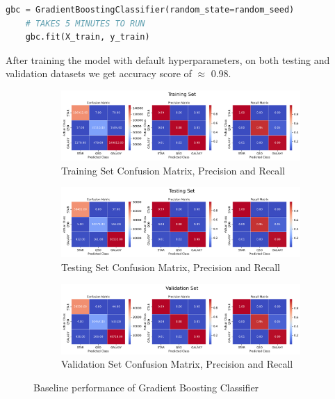 \begin{lstlisting}[language=Python]
    gbc = GradientBoostingClassifier(random_state=random_seed)
    # TAKES 5 MINUTES TO RUN
    gbc.fit(X_train, y_train)
\end{lstlisting}

After training the model with default hyperparameters, on both testing and validation datasets we get accuracy score of $\approx$ 0.98.

\begin{figure} 
    \centering
    \begin{subfigure}{\textwidth}
        \includegraphics[width=\linewidth]{images/Baseline_GBC_Train.png}
        \caption{Training Set Confusion Matrix, Precision and Recall}
        \label{fig:BaselineGBCTrain}
    \end{subfigure}
    \begin{subfigure}{\textwidth}
        \includegraphics[width=\linewidth]{images/Baseline_GBC_Test.png}
        \caption{Testing Set Confusion Matrix, Precision and Recall}
        \label{fig:BaselineGBCTest}
    \end{subfigure}
    \begin{subfigure}{\textwidth}
        \includegraphics[width=\linewidth]{images/Baseline_GBC_Val.png}
        \caption{Validation Set Confusion Matrix, Precision and Recall}
        \label{fig:BaselineGBCVal}
    \end{subfigure}
    \caption{Baseline performance of Gradient Boosting Classifier}
    \label{fig:BaselineGBC}
\end{figure}

